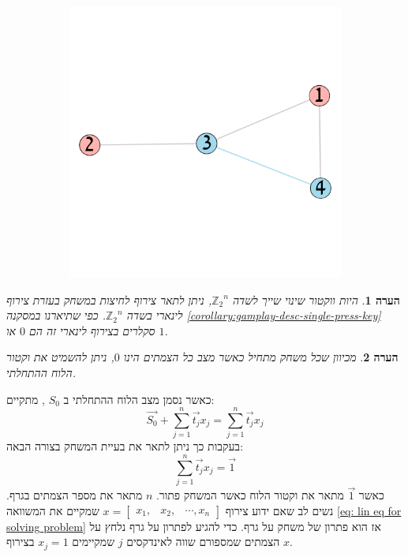 \documentclass[12pt,leqno]{article}
\theoremstyle{theoremdd}
\newtheorem{comm}{הערה}[section]
\newcommand{\sumi}[1]{\sum_{#1=1}^n}
\newcommand{\Zn}{{\mathbb{Z}_2}^n}
\begin{document}
\begin{figure}[ht]
\begin{subfigure}[b]{.4\linewidth}
        \includegraphics[width=.7\textwidth,keepaspectratio]{images/graph_presses_solve.png}
    \end{subfigure}
\end{figure}

\begin{comm}
    היות ווקטור שינוי שייך לשדה
    $\Zn$,
    ניתן לתאר צירוף לחיצות במשחק 
    בעזרת צירוף לינארי 
    בשדה 
    $\Zn$.
    כפי שתיארנו במסקנה 
    \ref{corollary:gamplay-desc-single-press-key}
    סקלרים בצירוף לינארי זה הם
    $0$
    או 
    $1$.
\end{comm}
\begin{comm}
    מכיוון שכל משחק מתחיל 
    כאשר מצב כל הצמתים הינו 
    $0$,
    ניתן 
    להשמיט
    את וקטור הלוח 
    ההתחלתי.
\end{comm}

כאשר
נסמן מצב הלוח ההתחלתי 
ב
$S_0$
,
מתקיים:
\begin{equation}
    \label{eq: sum change vectors}
    \vec{S_0} + \sumi{j} \vec{t_j} x_j=  \sumi{j}  \vec{t_j}x_j
\end{equation}
בעקבות כך ניתן לתאר את בעיית המשחק בצורה הבאה:
\begin{equation}
    \label{eq: lin eq for solving problem}
    \sumi{j} \vec{t_j} x_j = \vec{1}
\end{equation}
כאשר
$\vec{1}$
מתאר 
את וקטור הלוח כאשר המשחק פתור.
$n$
מתאר
את
מספר הצמתים בגרף.
נשים לב 
שאם 
ידוע צירוף
$x = \begin{bmatrix}
    x_1, & x_2, & \cdots , x_n
\end{bmatrix}$
שמקיים את המשוואה 
\ref{eq: lin eq for solving problem}
אז הוא פתרון של משחק על גרף.
כדי להגיע לפתרון על גרף נלחץ על הצמתים שמספורם 
שווה 
לאינדקסים 
$j$
שמקיימים
$x_j = 1$
בצירוף 
$x$.
\end{document}
